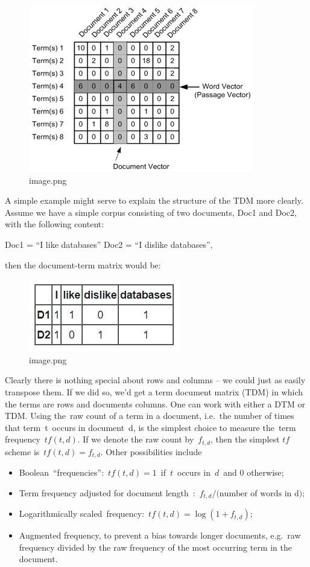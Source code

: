 \documentclass[11pt]{article}
\providecommand{\tightlist}{%
      \setlength{\itemsep}{0pt}\setlength{\parskip}{0pt}}
\begin{document}
    \begin{figure}
\centering
\includegraphics{./img/tf-idf-0.png}
\caption{image.png}
\end{figure}

    A simple example might serve to explain the structure of the TDM more
clearly. Assume we have a simple corpus consisting of two documents,
Doc1 and Doc2, with the following content:

Doc1 = ``I like databases'' Doc2 = ``I dislike databases'',

then the document-term matrix would be:

    \begin{figure}
\centering
\includegraphics{./img/tf-idf-1.png}
\caption{image.png}
\end{figure}

    Clearly there is nothing special about rows and columns -- we could just
as easily transpose them. If we did so, we'd get a term document matrix
(TDM) in which the terms are rows and documents columns. One can work
with either a DTM or TDM. Using the~raw count of a term in a document,
i.e.~the number of times that term~t~occurs in document~d, is the
simplest choice to measure the~term frequency~\(tf(t,d)\). If we denote
the raw count by~\(f_{t,d}\), then the simplest \(tf\) scheme
is~\(tf(t,d) = f_{t,d}\). Other possibilities include

\begin{itemize}
\tightlist
\item
  Boolean~``frequencies'':~\(tf(t,d) = 1\)~if~\(t\)~occurs in~\(d\)~and
  \(0\) otherwise;
\item
  Term frequency adjusted for document
  length~:~\(f_{t,d} \big/ \text{(number of words in d)}\);
\item
  Logarithmically scaled~frequency:~\(tf(t,d) = \log (1 + f_{t,d})\);
\item
  Augmented frequency, to prevent a bias towards longer documents,
  e.g.~raw frequency divided by the raw frequency of the most occurring
  term in the document.
\end{itemize}
\end{document}

